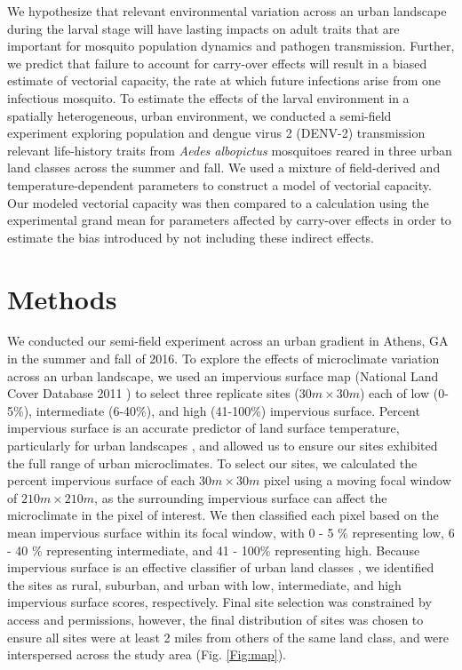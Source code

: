 \documentclass[doublespacing, linenumbers]{bmcart}
\begin{document}
We hypothesize that relevant environmental variation across an urban landscape during the larval stage will have lasting impacts on adult traits that are important for mosquito population dynamics and pathogen transmission.
Further, we predict that failure to account for carry-over effects will result in a biased estimate of vectorial capacity, the rate at which future infections arise from one infectious mosquito.
To estimate the effects of the larval environment in a spatially heterogeneous, urban environment, we conducted a semi-field experiment exploring population and dengue virus 2 (DENV-2) transmission relevant life-history traits from \textit{Aedes albopictus} mosquitoes reared in three urban land classes across the summer and fall.
We used a mixture of field-derived and temperature-dependent parameters to construct a model of vectorial capacity.
Our modeled vectorial capacity was then compared to a calculation using the experimental grand mean for parameters affected by carry-over effects in order to estimate the bias introduced by not including these indirect effects.

\section*{Methods}


We conducted our semi-field experiment across an urban gradient in Athens, GA in the summer and fall of 2016. To explore the effects of microclimate variation across an urban landscape, we used an impervious surface map (National Land Cover Database 2011 \cite{xian2011}) to select three replicate sites ($30m \times 30m$) each of low (0-5\%), intermediate (6-40\%), and high (41-100\%) impervious surface.
Percent impervious surface is an accurate predictor of land surface temperature, particularly for urban landscapes \cite{yuan2007}, and allowed us to ensure our sites exhibited the full range of urban microclimates.
To select our sites, we calculated the percent impervious surface of each $30m \times 30m$ pixel using a moving focal window of $210m \times 210m$, as the surrounding impervious surface can affect the microclimate in the pixel of interest.
We then classified each pixel based on the mean impervious surface within its focal window, with 0 - 5 \% representing low, 6 - 40 \% representing intermediate, and 41 - 100\% representing high.
Because impervious surface is an effective classifier of urban land classes \cite{lu2006}, we identified the sites as rural, suburban, and urban with low, intermediate, and high impervious surface scores, respectively.
Final site selection was constrained by access and permissions, however, the final distribution of sites was chosen to ensure all sites were at least 2 miles from others of the same land class, and were interspersed across the study area (Fig. \ref{Fig:map}).
\end{document}
